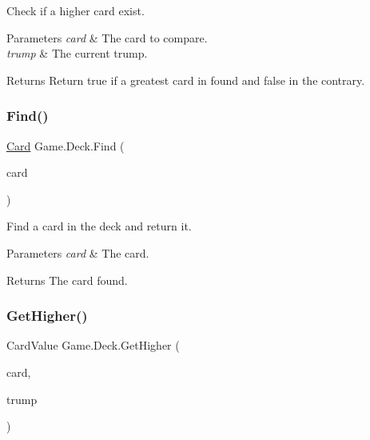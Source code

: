 Check if a higher card exist. 
\begin{DoxyParams}{Parameters}
{\em card} & The card to compare. \\
\hline
{\em trump} & The current trump. \\
\hline
\end{DoxyParams}
\begin{DoxyReturn}{Returns}
Return true if a greatest card in found and false in the contrary. 
\end{DoxyReturn}
\mbox{\label{class_game_1_1_deck_ae871b4e89aa2cb118bf33afd885a3e4c}} 
\subsubsection{\texorpdfstring{Find()}{Find()}}
{\footnotesize\ttfamily \hyperlink{class_game_1_1_card}{Card} Game.\+Deck.\+Find (\begin{DoxyParamCaption}\item[{\hyperlink{class_game_1_1_card}{Card}}]{card }\end{DoxyParamCaption})\hspace{0.3cm}{\ttfamily [inline]}}

Find a card in the deck and return it. 
\begin{DoxyParams}{Parameters}
{\em card} & The card. \\
\hline
\end{DoxyParams}
\begin{DoxyReturn}{Returns}
The card found. 
\end{DoxyReturn}
\mbox{\label{class_game_1_1_deck_a7c461ece0d32eccaaa1c3047a24a214e}} 
\subsubsection{\texorpdfstring{Get\+Higher()}{GetHigher()}}
{\footnotesize\ttfamily Card\+Value Game.\+Deck.\+Get\+Higher (\begin{DoxyParamCaption}\item[{\hyperlink{class_game_1_1_card}{Card}}]{card,  }\item[{\hyperlink{namespace_game_ae93b4df2175d9820e5d19dc1ab708e7e}{C\+O\+N\+T\+R\+A\+C\+T\+\_\+\+T\+Y\+PE}}]{trump }\end{DoxyParamCaption})\hspace{0.3cm}{\ttfamily [inline]}}

